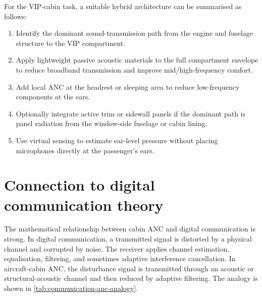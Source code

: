 For the VIP-cabin task, a suitable hybrid architecture can be summarised as follows:
\begin{enumerate}
    \item Identify the dominant sound-transmission path from the engine and fuselage structure to the VIP compartment.
    \item Apply lightweight passive acoustic materials to the full compartment envelope to reduce broadband transmission and improve mid/high-frequency comfort.
    \item Add local ANC at the headrest or sleeping area to reduce low-frequency components at the ears.
    \item Optionally integrate active trim or sidewall panels if the dominant path is panel radiation from the window-side fuselage or cabin lining.
    \item Use virtual sensing to estimate ear-level pressure without placing microphones directly at the passenger's ears.
\end{enumerate}

\section{Connection to digital communication theory}
\label{sec:digital-communication}

The mathematical relationship between cabin ANC and digital communication is strong. In digital communication, a transmitted signal is distorted by a physical channel and corrupted by noise. The receiver applies channel estimation, equalisation, filtering, and sometimes adaptive interference cancellation. In aircraft-cabin ANC, the disturbance signal is transmitted through an acoustic or structural-acoustic channel and then reduced by adaptive filtering. The analogy is shown in \cref{tab:communication-anc-analogy}.

